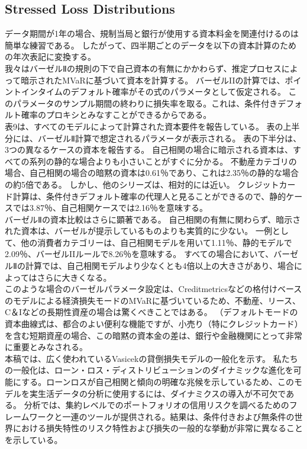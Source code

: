 \documentclass[a4j,12pt]{jarticle}
\begin{document}
\subsection{Stressed Loss Distributions}
データ期間が1年の場合、規制当局と銀行が使用する資本料金を関連付けるのは簡単な練習である。 したがって、四半期ごとのデータを以下の資本計算のための年次表記に変換する。\\
我々はバーゼルⅡの規則の下で自己資本の有無にかかわらず、推定プロセスによって暗示されたMVaRに基づいて資本を計算する。 バーゼルIIの計算では、ポイントインタイムのデフォルト確率がその式のパラメータとして仮定される。 このパラメータのサンプル期間の終わりに損失率を取る。これは、条件付きデフォルト確率のプロキシとみなすことができるからである。\\
表9は、すべてのモデルによって計算された資本要件を報告している。 表の上半分には、バーゼルⅡ計算で想定されるパラメータが表示される。 表の下半分は、3つの異なるケースの資本を報告する。 自己相関の場合に暗示される資本は、すべての系列の静的な場合よりも小さいことがすぐに分かる。 不動産カテゴリの場合、自己相関の場合の暗黙の資本は0.61％であり、これは2.35％の静的な場合の約5倍である。 しかし、他のシリーズは、相対的には近い。 クレジットカード計算は、条件付きデフォルト確率の代理人と見ることができるので、静的ケースでは3.87％、自己相関ケースでは2.16％を意味する。\\
バーゼルⅡの資本比較はさらに顕著である。 自己相関の有無に関わらず、暗示された資本は、バーゼルが提示しているものよりも実質的に少ない。 一例として、他の消費者カテゴリーは、自己相関モデルを用いて1.11％、静的モデルで2.09％、バーゼルIIルールで8.26％を意味する。 すべての場合において、バーゼルⅡの計算では、自己相関モデルより少なくとも4倍以上の大きさがあり、場合によってはさらに大きくなる。\\
このような場合のバーゼルパラメータ設定は、Creditmetricsなどの格付けベースのモデルによる経済損失モードのMVaRに基づいているため、不動産、リース、C＆Iなどの長期性資産の場合は驚くべきことではある。 （デフォルトモードの資本曲線式は、都合のよい便利な機能ですが、小売り（特にクレジットカード）を含む短期資産の場合、この暗黙の資本金の差は、銀行や金融機関にとって非常に重要とみなされる。 \\
本稿では、広く使われているVasicekの貸倒損失モデルの一般化を示す。 私たちの一般化は、ローン・ロス・ディストリビューションのダイナミックな進化を可能にする。ローンロスが自己相関と傾向の明確な兆候を示しているため、このモデルを実生活データの分析に使用するには、ダイナミクスの導入が不可欠である。
分析では、集約レベルでのポートフォリオの信用リスクを調べるためのフレームワークと一連のツールが提供される。結果は、条件付きおよび無条件の世界における損失特性のリスク特性および損失の一般的な挙動が非常に異なることを示している。
\end{document}
